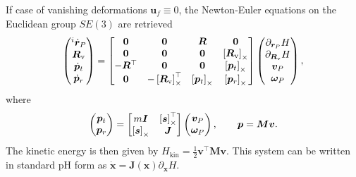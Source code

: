 \begin{remark}
	If case of vanishing deformations $\bm{u}_f \equiv 0$, the Newton-Euler equations on the Euclidean group $SE(3)$ are retrieved \cite{celledoni2018passivity}
	\begin{equation*}
	\begin{pmatrix}
	^i\dot{\bm{r}}_P \\ \bm{R}_{\mathrm{v}} \\\dot{\bm{p}}_t \\ \dot{\bm{p}}_r \\
	\end{pmatrix} = 
	\begin{bmatrix}
	\bm{0} & \bm{0} &\bm{R} & \bm{0} \\
	\bm{0} & \bm{0} & \bm{0} & \left[\bm{R}_{\mathrm{v}}\right]_\times \\
	- \bm{R}^\top & \bm{0} & \bm{0} & \left[\bm{p}_t\right]_\times\\
	\bm{0} & -\left[\bm{R}_{\mathrm{v}}\right]_\times^\top & \left[\bm{p}_t\right]_\times & \left[\bm{p}_r\right]_\times \\
	\end{bmatrix}
	\begin{pmatrix}
	\partial_{\bm{r}_P} H \\ \partial_{\bm{R}_{\mathrm{v}}} H \\ \bm{v}_P \\ \bm{\omega}_P  \\
	\end{pmatrix},
	\end{equation*}
	where
	\begin{equation*}
	\begin{pmatrix}
	\bm{p}_t \\ \bm{p}_r \\ 
	\end{pmatrix} = 
	\begin{bmatrix}
	m \bm{I} & \left[\bm{s}\right]_\times^\top \\
	\left[\bm{s}\right]_\times & \bm{J} \\
	\end{bmatrix}
	\begin{pmatrix}
	\bm{v}_P \\ \bm{\omega}_P  \\ 
	\end{pmatrix}, \qquad \bm{p} = \bm{M} \bm{v}.
	\end{equation*}
	The kinetic energy is then given by $H_{\mathrm{kin}} = \frac{1}{2} \bm{v}^\top \bm{M} \bm{v}$.
	This system can be written in standard pH form as $\dot{\bm{x}} = \bm{J}(\bm{x})\partial_{\bm{x}} H$.
\end{remark}

